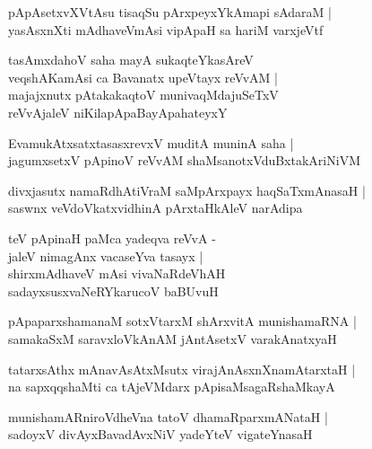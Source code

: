 \documentclass[twoside,12pt,openright]{book}
\newcounter{shloka}[chapter]
\begin{document}
\begin{shloka}%
pApAsetxvXVtAsu tisaqSu pArxpeyxYkAmapi sAdaraM |\\
yasAsxnXti mAdhaveVmAsi vipApaH  sa hariM varxjeVtf
\end{shloka}

\begin{shloka}%
tasAmxdahoV saha mayA sukaqteYkasAreV \\
veqshAKamAsi ca Bavanatx upeVtayx reVvAM |\\
majajxnutx pAtakakaqtoV munivaqMdajuSeTxV \\
reVvAjaleV niKilapApaBayApahateyxY
\end{shloka}

\begin{shloka}%
EvamukAtxsatxtasasxrevxV muditA muninA saha |\\
jagumxsetxV pApinoV reVvAM shaMsanotxVduBxtakAriNiVM 
\end{shloka}

\begin{shloka}%
divxjasutx namaRdhAtiVraM saMpArxpayx haqSaTxmAnasaH |\\
saswnx veVdoVkatxvidhinA pArxtaHkAleV narAdipa 
\end{shloka}

\begin{shloka}%
teV pApinaH paMca yadeqva reVvA -\\
jaleV nimagAnx vacaseYva tasayx |\\
shirxmAdhaveV mAsi vivaNaRdeVhAH \\
sadayxsusxvaNeRYkarucoV baBUvuH 
\end{shloka}

\begin{shloka}%
pApaparxshamanaM sotxVtarxM shArxvitA munishamaRNA |\\
samakaSxM saravxloVkAnAM jAntAsetxV varakAnatxyaH 
\end{shloka}

\begin{shloka}%
tatarxsAthx mAnavAsAtxMsutx virajAnAsxnXnamAtarxtaH |\\
na sapxqqshaMti ca tAjeVMdarx pApisaMsagaRshaMkayA 
\end{shloka}

\begin{shloka}%
munishamARniroVdheVna tatoV dhamaRparxmANataH |\\
sadoyxV divAyxBavadAvxNiV yadeYteV vigateYnasaH 
\end{shloka}
\end{document}
